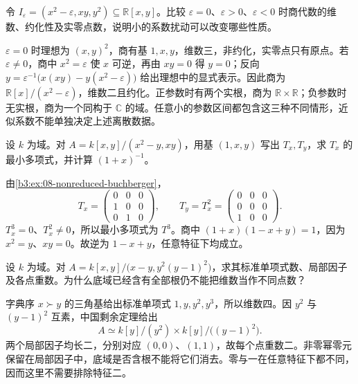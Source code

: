 \begin{exercise}\label{b3:ex:08-near-zero-not-zero}
	令 \(I_\varepsilon=(x^2-\varepsilon,xy,y^2)\subseteq\mathbb R[x,y]\)。比较 \(\varepsilon=0\)、\(\varepsilon>0\)、\(\varepsilon<0\) 时商代数的维数、约化性及实零点数，说明小的系数扰动可以改变哪些性质。
\end{exercise}
\begin{solution}
	\(\varepsilon=0\) 时理想为 \((x,y)^2\)，商有基 \(1,x,y\)，维数三，非约化，实零点只有原点。若 \(\varepsilon\ne0\)，商中 \(x^2=\varepsilon\) 使 \(x\) 可逆，再由 \(xy=0\) 得 \(y=0\)；反向 \(y=\varepsilon^{-1}\bigl(x(xy)-y(x^2-\varepsilon)\bigr)\) 给出理想中的显式表示。因此商为 \(\mathbb R[x]/(x^2-\varepsilon)\)，维数二且约化。正参数时有两个实根，商为 \(\mathbb R\times\mathbb R\)；负参数时无实根，商为一个同构于 \(\mathbb C\) 的域。任意小的参数区间都包含这三种不同情形，近似系数不能单独决定上述离散数据。
\end{solution}

\begin{exercise}\label{b3:ex:08-multiplication-nilpotent}
	设 \(k\) 为域。对 \(A=k[x,y]/(x^2-y,xy)\)，用基 \((1,x,y)\) 写出 \(T_x,T_y\)，求 \(T_x\) 的最小多项式，并计算 \((1+x)^{-1}\)。
\end{exercise}
\begin{solution}
	由\cref{b3:ex:08-nonreduced-buchberger}，
	\[
		T_x=\begin{pmatrix}0&0&0\\1&0&0\\0&1&0\end{pmatrix},
		\qquad T_y=T_x^2=\begin{pmatrix}0&0&0\\0&0&0\\1&0&0\end{pmatrix}.
	\]
	\(T_x^3=0\)、\(T_x^2\ne0\)，所以最小多项式为 \(T^3\)。商中 \((1+x)(1-x+y)=1\)，因为 \(x^2=y\)、\(xy=0\)。故逆为 \(1-x+y\)，任意特征下均成立。
\end{solution}

\begin{exercise}\label{b3:ex:08-double-points-length}
	设 \(k\) 为域。对 \(A=k[x,y]/\bigl(x-y,y^2(y-1)^2\bigr)\)，求其标准单项式数、局部因子及各点重数。为什么底域已经含有全部根仍不能把维数当作不同点数？
\end{exercise}
\begin{solution}
	字典序 \(x\succ y\) 的三角基给出标准单项式 \(1,y,y^2,y^3\)，所以维数四。因 \(y^2\) 与 \((y-1)^2\) 互素，中国剩余定理给出
	\[
		A\simeq k[y]/(y^2)\times k[y]/\bigl((y-1)^2\bigr).
	\]
	两个局部因子均长二，分别对应 \((0,0)\)、\((1,1)\)，故每个点重数二。非零幂零元保留在局部因子中，底域是否含根不能将它们消去。零与一在任意特征下都不同，因而这里不需要排除特征二。
\end{solution}

